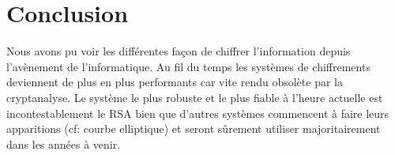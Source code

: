 \chapter*{Conclusion}
Nous avons pu voir les différentes façon de chiffrer l'information depuis l'avènement de l'informatique. Au fil du temps les systèmes de chiffrements deviennent de plus en plus performants car vite rendu obsolète par la cryptanalyse. Le système le plus robuste et le plus fiable à l'heure actuelle est incontestablement le RSA bien que d'autres systèmes commencent à faire leurs apparitions (cf: courbe elliptique) et seront sûrement utiliser majoritairement dans les années à venir.
